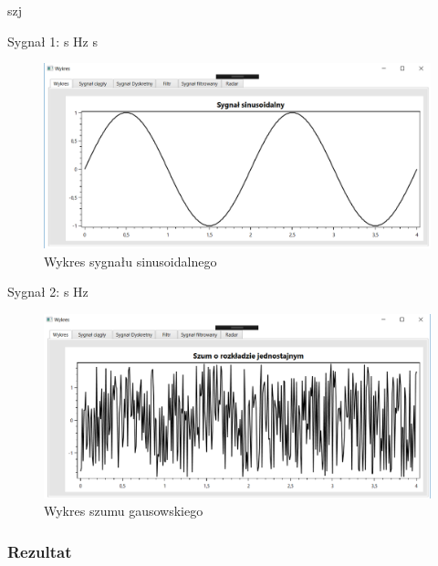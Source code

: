 \documentclass[12pt]{article}
\begin{document}
\begin{labeling}{szj}
\item [Sygnał 1:] 
 s
 Hz
 s

\begin{figure}[h!]
 \centering
 \includegraphics[width=12.3cm]{sin.PNG}
 \vspace{-0.3cm}
 \caption{Wykres sygnału sinusoidalnego}
 \label{sin}
\end{figure}

\item [Sygnał 2:] 
 s
 Hz

\end{labeling}

\begin{figure}[h!]
 \centering
 \includegraphics[width=12.3cm]{szum.PNG}
 \vspace{-0.3cm}
 \caption{Wykres szumu gausowskiego}
 \label{szum}
\end{figure}
 \newpage
\subsubsection{Rezultat}
\end{document}
